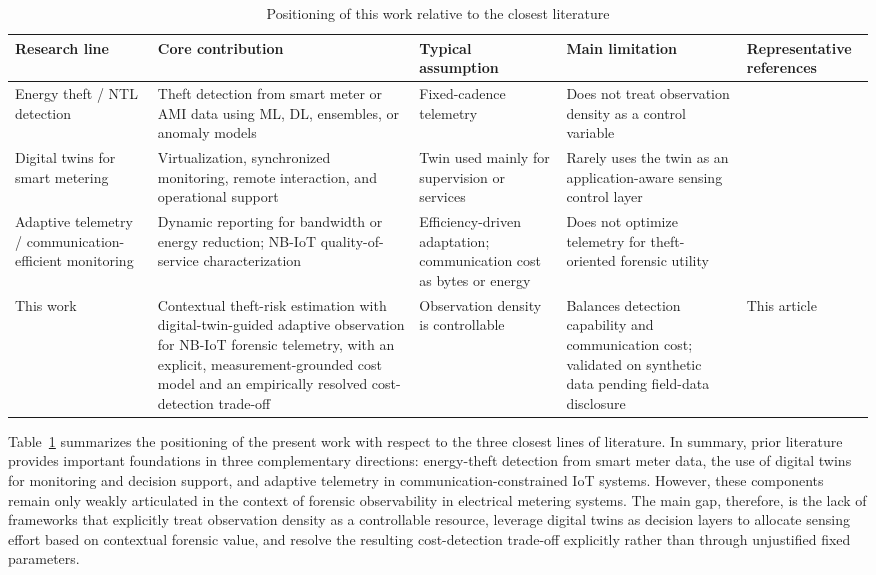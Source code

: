 \documentclass{ieeeaccess}
\begin{document}
\begin{table}[!ht]
\centering
\caption{Positioning of this work relative to the closest literature}
\label{tab:rw_comparison}
\begin{tabular}{|p{2cm}|p{4.6cm}|p{2.4cm}|p{4.1cm}|p{1.9cm}|}
\hline
\textbf{Research line} & \textbf{Core contribution} & \textbf{Typical assumption} & \textbf{Main limitation} & \textbf{Representative references} \\
\hline
Energy theft / NTL detection & Theft detection from smart meter or AMI data using ML, DL, ensembles, or anomaly models & Fixed-cadence telemetry & Does not treat observation density as a control variable & \cite{b1,b2,b3,b4,b5,b6,b7,b8,b9,b10,b11,b12,b13,b14,b38} \\
\hline
Digital twins for smart metering & Virtualization, synchronized monitoring, remote interaction, and operational support & Twin used mainly for supervision or services & Rarely uses the twin as an application-aware sensing control layer & \cite{b18,b19,b20,b21,b22,b23,b24,b25} \\
\hline
Adaptive telemetry / communication-efficient monitoring & Dynamic reporting for bandwidth or energy reduction; NB-IoT quality-of-service characterization & Efficiency-driven adaptation; communication cost as bytes or energy & Does not optimize telemetry for theft-oriented forensic utility & \cite{b26,b27,b28,b29,b30,b31,b32,b33,b34,b35} \\
\hline
This work & Contextual theft-risk estimation with digital-twin-guided adaptive observation for NB-IoT forensic telemetry, with an explicit, measurement-grounded cost model and an empirically resolved cost-detection trade-off & Observation density is controllable & Balances detection capability and communication cost; validated on synthetic data pending field-data disclosure & This article \\
\hline
\end{tabular}
\end{table}

Table~\ref{tab:rw_comparison} summarizes the positioning of the present work with respect to the three closest lines of literature. In summary, prior literature provides important foundations in three complementary directions: energy-theft detection from smart meter data, the use of digital twins for monitoring and decision support, and adaptive telemetry in communication-constrained IoT systems. However, these components remain only weakly articulated in the context of forensic observability in electrical metering systems. The main gap, therefore, is the lack of frameworks that explicitly treat observation density as a controllable resource, leverage digital twins as decision layers to allocate sensing effort based on contextual forensic value, and resolve the resulting cost-detection trade-off explicitly rather than through unjustified fixed parameters.
\end{document}
